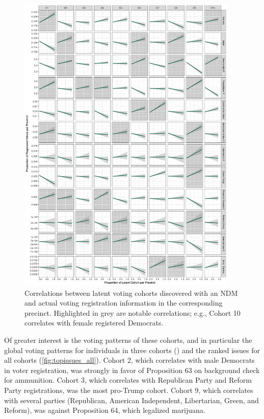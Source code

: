 \documentclass[twoside,11pt]{article}
\begin{document}
\begin{figure}[p]
\centering
\includegraphics[width=0.938\textwidth]{cohort_demographics.pdf}
\caption{Correlations between latent voting cohorts discovered with an NDM and actual voting registration information in the corresponding precinct.  Highlighted in grey are notable correlations; e.g., Cohort 10 correlates with female registered Democrats.}
\label{fig:demographics}
\end{figure}

Of greater interest is the voting patterns of these cohorts, and in particular the global voting patterns for individuals in three cohorts () and the ranked issues for all cohorts (\cref{fig:topissues_all}).  Cohort 2, which correlates with male Democrats in voter registration, was strongly in favor of Proposition 63 on background check for ammunition.  Cohort 3, which correlates with Republican Party and Reform Party registrations, was the most pro-Trump cohort.  Cohort 9, which correlates with several parties (Republican, American Independent, Libertarian, Green, and Reform), was against Proposition 64, which legalized marijuana.
\end{document}
